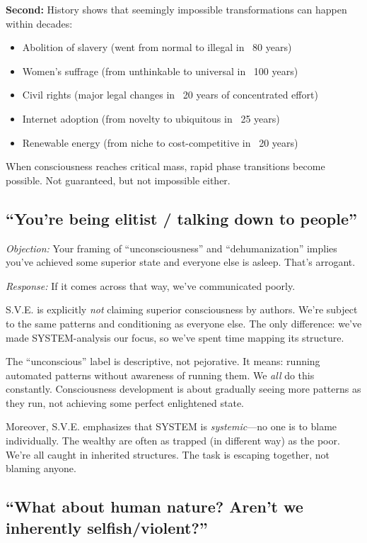 \documentclass[11pt,a4paper]{article}
\theoremstyle{definition}
\theoremstyle{remark}
\begin{document}
\textbf{Second:} History shows that seemingly impossible transformations can happen within decades:
\begin{itemize}
    \item Abolition of slavery (went from normal to illegal in ~80 years)
    \item Women's suffrage (from unthinkable to universal in ~100 years)
    \item Civil rights (major legal changes in ~20 years of concentrated effort)
    \item Internet adoption (from novelty to ubiquitous in ~25 years)
    \item Renewable energy (from niche to cost-competitive in ~20 years)
\end{itemize}

When consciousness reaches critical mass, rapid phase transitions become possible. Not guaranteed, but not impossible either.

\subsection{``You're being elitist / talking down to people''}

\textit{Objection:} Your framing of ``unconsciousness'' and ``dehumanization'' implies you've achieved some superior state and everyone else is asleep. That's arrogant.

\textit{Response:} If it comes across that way, we've communicated poorly.

S.V.E. is explicitly \textit{not} claiming superior consciousness by authors. We're subject to the same patterns and conditioning as everyone else. The only difference: we've made SYSTEM-analysis our focus, so we've spent time mapping its structure.

The ``unconscious'' label is descriptive, not pejorative. It means: running automated patterns without awareness of running them. We \textit{all} do this constantly. Consciousness development is about gradually seeing more patterns as they run, not achieving some perfect enlightened state.

Moreover, S.V.E. emphasizes that SYSTEM is \textit{systemic}---no one is to blame individually. The wealthy are often as trapped (in different way) as the poor. We're all caught in inherited structures. The task is escaping together, not blaming anyone.

\subsection{``What about human nature? Aren't we inherently selfish/violent?''}
\end{document}

